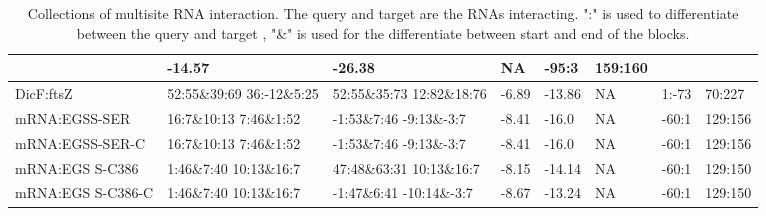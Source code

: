 \documentclass[twoside,a4paper]{report}
\numberwithin{equation}{section}
\begin{document}
\begin{table}[H]
\begin{tabular}{ |p{2cm}|p{2.5cm}|p{2.2cm}|p{0.8cm}|p{0.9cm}|p{0.9cm}|p{0.8cm}|p{1cm}|}
		& \hbox{-14.57} & \hbox{-26.38} &NA & -95:3 &159:160\\
		\hline
		DicF:ftsZ&52:55\&39:69   \hbox{36:-12\&5:25}  &52:55\&35:73 12:82\&18:76	& -6.89 & \hbox{-13.86} &NA &1:-73 &70:227 \\
		\hline
		mRNA:EGSS-SER &16:7\&10:13 7:46\&1:52
		  &-1:53\&7:46 \hbox{-9:13\&-3:7}
		 & -8.41 &-16.0 &NA & -60:1 &129:156 \\
		\hline
		mRNA:EGSS-SER-C &16:7\&10:13 7:46\&1:52
		  &-1:53\&7:46 \hbox{-9:13\&-3:7}
		 & -8.41 &-16.0 &NA & -60:1 &129:156 \\
		\hline
		mRNA:EGS S-C386 &1:46\&7:40 10:13\&16:7 &
		47:48\&63:31 10:13\&16:7
		  & -8.15& \hbox{-14.14} &NA & -60:1 &129:150 \\
		\hline
		mRNA:EGS S-C386-C &1:46\&7:40 10:13\&16:7
		 &-1:47\&6:41 \hbox{-10:14\&-3:7}
		  & -8.67 & \hbox{-13.24} &NA & -60:1 &129:150 \\
		\hline
	\end{tabular}
	\caption{Collections of multisite RNA interaction. The query and target are the RNAs interacting. ":" is used to differentiate between the query and target , "\&" is used for the differentiate between start and end of the blocks.  }	
		\label{table:2}
\end{table}



	
%	
%	
%	
%	
%	 
%
%
%	  
%	 
%	
%	 
%	 
%	 
	
\end{document}
